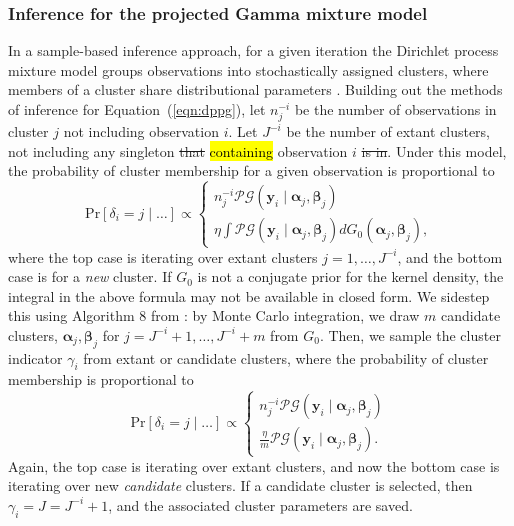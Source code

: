 \documentclass[iicol,sn-basic]{sn-jnl}
\theoremstyle{thmstyleone}
\begin{document}
\subsubsection{Inference for the projected Gamma mixture model}
In a sample-based inference approach, for a given iteration the Dirichlet process mixture model groups observations into stochastically assigned clusters, where members of a cluster share distributional parameters\hl{ \mbox{\citep{muller2015,ascolani2022}}}. Building out the methods of inference for Equation~(\ref{eqn:dppg}), let $n_j^{-i}$ be the number of observations in cluster $j$ not including observation $i$.  Let $J^{-i}$ be the number of extant clusters, not including any singleton \st{that} \hl{containing} observation $i$ \st{is in}. Under this model, the probability of cluster membership for a given observation is proportional to
\begin{equation*}
\text{Pr}\left[\delta_i = j\mid\ldots\right] \propto \begin{cases}
n_j^{-i}\mathcal{PG}\left(\bm{y}_i\mid\bm{\alpha}_j,\bm{\beta}_j\right)\\ %
\eta\int\mathcal{PG}\left(\bm{y}_i\mid\bm{\alpha}_j,\bm{\beta}_j\right)dG_0(\bm{\alpha}_j,\bm{\beta}_j),%
\end{cases}
\end{equation*}
where the top case is iterating over extant clusters $j = 1,\ldots, J^{-i}$, and the bottom case is for a \emph{new} cluster. If $G_0$ is not a conjugate prior for the kernel density, the integral in the above formula may not be available in closed form. We sidestep this using Algorithm 8 from \cite{neal2000}: by Monte Carlo integration, we draw $m$ candidate clusters, $\bm{\alpha}_j,\bm{\beta}_j$ for $j = J^{-i} + 1,\ldots, J^{-i} + m$ from $G_0$. Then, we sample the cluster indicator $\gamma_i$ from extant or candidate clusters, where the probability of cluster membership is proportional to
\begin{equation}
\text{Pr}\left[\delta_i = j\mid\ldots\right] \propto \begin{cases}
n_j^{-i}\mathcal{PG}\left(\bm{y}_i\mid\bm{\alpha}_j,\bm{\beta}_j\right)\\ %
\frac{\eta}{m}\mathcal{PG}\left(\bm{y}_i\mid\bm{\alpha}_j,\bm{\beta}_j\right). %
\end{cases}
\end{equation}
Again, the top case is iterating over extant clusters, and now the bottom case is iterating over new \emph{candidate} clusters.  If a candidate cluster is selected, then $\gamma_i = J = J^{- i} + 1$, and the associated cluster parameters are saved.
\end{document}
